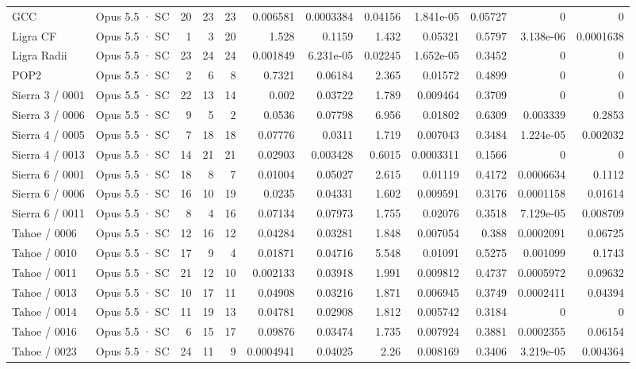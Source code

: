 \begin{tabular}{llrrrrrrrrrr}
GCC & Opus 5.5 · SC & 20 & 23 & 23 & 0.006581 & 0.0003384 & 0.04156 & 1.841e-05 & 0.05727 & 0 & 0 \\
Ligra CF & Opus 5.5 · SC & 1 & 3 & 20 & 1.528 & 0.1159 & 1.432 & 0.05321 & 0.5797 & 3.138e-06 & 0.0001638 \\
Ligra Radii & Opus 5.5 · SC & 23 & 24 & 24 & 0.001849 & 6.231e-05 & 0.02245 & 1.652e-05 & 0.3452 & 0 & 0 \\
POP2 & Opus 5.5 · SC & 2 & 6 & 8 & 0.7321 & 0.06184 & 2.365 & 0.01572 & 0.4899 & 0 & 0 \\
Sierra 3 / 0001 & Opus 5.5 · SC & 22 & 13 & 14 & 0.002 & 0.03722 & 1.789 & 0.009464 & 0.3709 & 0 & 0 \\
Sierra 3 / 0006 & Opus 5.5 · SC & 9 & 5 & 2 & 0.0536 & 0.07798 & 6.956 & 0.01802 & 0.6309 & 0.003339 & 0.2853 \\
Sierra 4 / 0005 & Opus 5.5 · SC & 7 & 18 & 18 & 0.07776 & 0.0311 & 1.719 & 0.007043 & 0.3484 & 1.224e-05 & 0.002032 \\
Sierra 4 / 0013 & Opus 5.5 · SC & 14 & 21 & 21 & 0.02903 & 0.003428 & 0.6015 & 0.0003311 & 0.1566 & 0 & 0 \\
Sierra 6 / 0001 & Opus 5.5 · SC & 18 & 8 & 7 & 0.01004 & 0.05027 & 2.615 & 0.01119 & 0.4172 & 0.0006634 & 0.1112 \\
Sierra 6 / 0006 & Opus 5.5 · SC & 16 & 10 & 19 & 0.0235 & 0.04331 & 1.602 & 0.009591 & 0.3176 & 0.0001158 & 0.01614 \\
Sierra 6 / 0011 & Opus 5.5 · SC & 8 & 4 & 16 & 0.07134 & 0.07973 & 1.755 & 0.02076 & 0.3518 & 7.129e-05 & 0.008709 \\
Tahoe / 0006 & Opus 5.5 · SC & 12 & 16 & 12 & 0.04284 & 0.03281 & 1.848 & 0.007054 & 0.388 & 0.0002091 & 0.06725 \\
Tahoe / 0010 & Opus 5.5 · SC & 17 & 9 & 4 & 0.01871 & 0.04716 & 5.548 & 0.01091 & 0.5275 & 0.001099 & 0.1743 \\
Tahoe / 0011 & Opus 5.5 · SC & 21 & 12 & 10 & 0.002133 & 0.03918 & 1.991 & 0.009812 & 0.4737 & 0.0005972 & 0.09632 \\
Tahoe / 0013 & Opus 5.5 · SC & 10 & 17 & 11 & 0.04908 & 0.03216 & 1.871 & 0.006945 & 0.3749 & 0.0002411 & 0.04394 \\
Tahoe / 0014 & Opus 5.5 · SC & 11 & 19 & 13 & 0.04781 & 0.02908 & 1.812 & 0.005742 & 0.3184 & 0 & 0 \\
Tahoe / 0016 & Opus 5.5 · SC & 6 & 15 & 17 & 0.09876 & 0.03474 & 1.735 & 0.007924 & 0.3881 & 0.0002355 & 0.06154 \\
Tahoe / 0023 & Opus 5.5 · SC & 24 & 11 & 9 & 0.0004941 & 0.04025 & 2.26 & 0.008169 & 0.3406 & 3.219e-05 & 0.004364 \\

\end{tabular}
